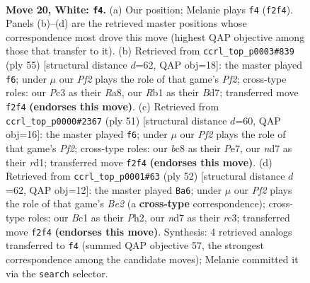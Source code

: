 \documentclass[11pt]{article}
\begin{document}
\clearpage

\begin{figure}[p]\centering
\begin{subfigure}{0.46\textwidth}\centering
\resizebox{\linewidth}{!}{%
\newchessgame
\chessboard[
  setfen={r1b3k1/3n4/1p4p1/p1p2p2/2P4p/2P5/P4PPP/1RBB2K1 w - - 2 20},
  showmover=false,
  pgfstyle=straightmove, color=movearrow, markmove={f2-f4}
]}
\caption{}
\end{subfigure}\hfill
\begin{subfigure}{0.46\textwidth}\centering
\resizebox{\linewidth}{!}{%
\newchessgame
\chessboard[
  setfen={r5k1/1ppb1pp1/7p/3P4/4p3/P3B2P/1P3PP1/3R1K2 b - - 4 28},
  showmover=false,
  pgfstyle=straightmove, color=movearrow, markmove={f7-f6}
]}
\caption{}
\end{subfigure}
\\[4pt]
\begin{subfigure}{0.46\textwidth}\centering
\resizebox{\linewidth}{!}{%
\newchessgame
\chessboard[
  setfen={6k1/4pp1p/2b3p1/p7/2p5/P1P1B1P1/1r2PP1P/3R1K2 b - - 1 26},
  showmover=false,
  pgfstyle=straightmove, color=movearrow, markmove={f7-f6}
]}
\caption{}
\end{subfigure}\hfill
\begin{subfigure}{0.46\textwidth}\centering
\resizebox{\linewidth}{!}{%
\newchessgame
\chessboard[
  setfen={6k1/1p1b3p/1P1p1p2/3P1p2/4p3/1pr1P3/4BPPP/1R2K3 w - - 0 27},
  showmover=false,
  pgfstyle=straightmove, color=movearrow, markmove={e2-a6}
]}
\caption{}
\end{subfigure}
\caption{\textbf{Move 20, White: \texttt{f4}.} (a) Our position; Melanie plays \texttt{f4} (\texttt{f2f4}). Panels (b)--(d) are the retrieved master positions whose correspondence most drove this move (highest QAP objective among those that transfer to it). (b) Retrieved from \texttt{ccrl\_top\_p0003\#839} (ply 55) [structural distance $d$=62, QAP obj=18]: the master played \texttt{f6}; under $\mu$ our \emph{Pf2} plays the role of that game's \emph{Pf2}; cross-type roles: our \emph{P}c3 as their \emph{R}a8, our \emph{R}b1 as their \emph{B}d7; transferred move \texttt{f2f4} \textbf{(endorses this move)}. (c) Retrieved from \texttt{ccrl\_top\_p0000\#2367} (ply 51) [structural distance $d$=60, QAP obj=16]: the master played \texttt{f6}; under $\mu$ our \emph{Pf2} plays the role of that game's \emph{Pf2}; cross-type roles: our \emph{b}c8 as their \emph{P}e7, our \emph{n}d7 as their \emph{r}d1; transferred move \texttt{f2f4} \textbf{(endorses this move)}. (d) Retrieved from \texttt{ccrl\_top\_p0001\#63} (ply 52) [structural distance $d$=62, QAP obj=12]: the master played \texttt{Ba6}; under $\mu$ our \emph{Pf2} plays the role of that game's \emph{Be2} (a \textbf{cross-type} correspondence); cross-type roles: our \emph{B}c1 as their \emph{P}h2, our \emph{n}d7 as their \emph{r}c3; transferred move \texttt{f2f4} \textbf{(endorses this move)}. Synthesis: 4 retrieved analogs transferred to \texttt{f4} (summed QAP objective 57, the strongest correspondence among the candidate moves); Melanie committed it via the \texttt{search} selector.}
\label{fig:thought-m38}
\end{figure}
\end{document}
